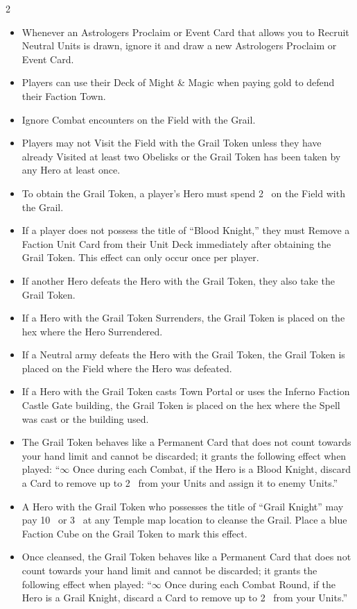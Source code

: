 \begin{multicols*}{2}
\begin{itemize}
  \item Whenever an Astrologers Proclaim or Event Card that allows you to Recruit Neutral Units is drawn, ignore it and draw a new Astrologers Proclaim or Event Card.
  \item Players can use their Deck of Might \& Magic when paying gold to defend their Faction Town.
  \item Ignore Combat encounters on the Field with the Grail.
  \item Players may not Visit the Field with the Grail Token unless they have already Visited at least two Obelisks or the Grail Token has been taken by any Hero at least once.
  \item To obtain the Grail Token, a player’s Hero must spend 2~ on the Field with the Grail.
  \item If a player does not possess the title of ``\textcolor{darkcandyapplered}{Blood Knight},'' they must Remove a Faction Unit Card from their Unit Deck immediately after obtaining the Grail Token. This effect can only occur once per player.
  \item If another Hero defeats the Hero with the Grail Token, they also take the Grail Token.
  \item If a Hero with the Grail Token Surrenders, the Grail Token is placed on the hex where the Hero Surrendered.
  \item If a Neutral army defeats the Hero with the Grail Token, the Grail Token is placed on the Field where the Hero was defeated.
  \item If a Hero with the Grail Token casts Town Portal or uses the Inferno Faction Castle Gate building, the Grail Token is placed on the hex where the Spell was cast or the building used.
  \item The Grail Token behaves like a Permanent Card that does not count towards your hand limit and cannot be discarded; it grants the following effect when played: ``$\infty$ Once during each Combat, if the Hero is a \textcolor{darkcandyapplered}{Blood Knight}, discard a Card to remove up to 2~ from your Units and assign it to enemy Units.''
  \item A Hero with the Grail Token who possesses the title of ``\textcolor{cobalt}{Grail Knight}'' may pay 10~ or 3~ at any Temple map location to cleanse the Grail. Place a blue Faction Cube on the Grail Token to mark this effect.
  \item Once cleansed, the Grail Token behaves like a Permanent Card that does not count towards your hand limit and cannot be discarded; it grants the following effect when played: ``$\infty$ Once during each Combat Round, if the Hero is a \textcolor{cobalt}{Grail Knight}, discard a Card to remove up to 2~ from your Units.''
\end{itemize}


\end{multicols*}

